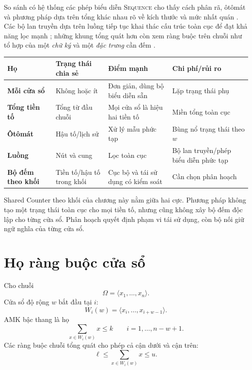 So sánh có hệ thống các phép biểu diễn \textsc{Sequence} cho thấy cách phân rã,
ôtômát và phương pháp dựa trên tổng khác nhau rõ về kích thước và mức nhất quán
\parencite{brand2007sequence}. Các bộ lan truyền dựa trên luồng tiếp tục khai
thác cấu trúc toàn cục để đạt khả năng lọc mạnh \parencite{maher2008sequence};
những khung tổng quát hơn còn xem ràng buộc trên chuỗi như tổ hợp của một
\emph{chữ ký} và một \emph{đặc trưng} cần đếm
\parencite{monette2014sequences}.

\begin{center}
\label{tab:window-reuse}
\begin{tabularx}{\textwidth}{@{}>{\bfseries\sffamily}p{}YYY@{}}
\toprule
Họ & Trạng thái chia sẻ & Điểm mạnh & Chi phí/rủi ro\\
\midrule
Mỗi cửa sổ & Không hoặc ít & Đơn giản, dùng bộ biểu diễn sẵn & Lặp trạng thái phụ\\
Tổng tiền tố & Tổng từ đầu chuỗi & Mọi cửa sổ là hiệu hai tiền tố & Miền tổng toàn cục\\
Ôtômát & Hậu tố/lịch sử & Xử lý mẫu phức tạp & Bùng nổ trạng thái theo \(w\)\\
Luồng & Nút và cung & Lọc toàn cục & Bộ lan truyền/phép biểu diễn phức tạp\\
Bộ đếm theo khối & Tiền tố/hậu tố trong khối & Cục bộ và tái sử dụng có kiểm soát &
Cần chọn phân hoạch\\
\bottomrule
\end{tabularx}
\end{center}

Shared Counter theo khối của chương này nằm giữa hai cực. Phương pháp không tạo một
trạng thái toàn cục cho mọi tiền tố, nhưng cũng không xây bộ đếm độc lập cho
từng cửa sổ. Phân hoạch quyết định phạm vi tái sử dụng, còn bộ nối giữ ngữ
nghĩa của từng cửa sổ.

\section{Họ ràng buộc cửa sổ}

Cho chuỗi
\[
  \Omega=\langle x_1,\ldots,x_n\rangle.
\]
Cửa sổ độ rộng \(w\) bắt đầu tại \(i\):
\[
  W_i(w)=\langle x_i,\ldots,x_{i+w-1}\rangle.
\]
AMK bậc thang là họ
\[
  \sum_{x\in W_i(w)}x\le k
  \qquad i=1,\ldots,n-w+1.
\]
Các ràng buộc chuỗi tổng quát cho phép cả cận dưới và cận trên:
\[
  \ell\le
  \sum_{x\in W_i(w)}x
  \le u.
\]


